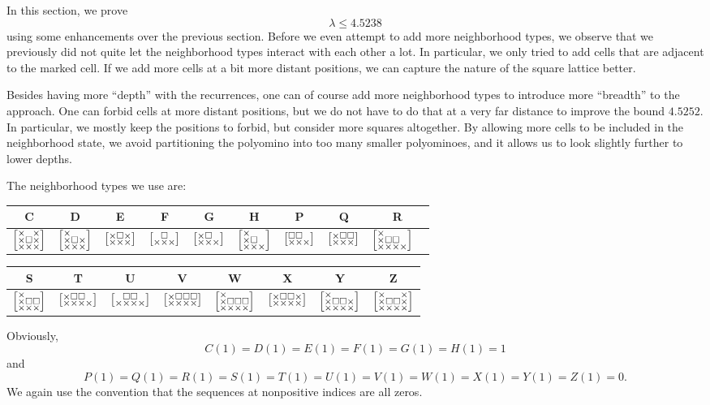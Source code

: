 \documentclass[a4paper,12pt]{article}
\makeatletter
\newenvironment{grid}
  {\begingroup\footnotesize
   \renewcommand{\arraystretch}{0}
   \setlength{\arraycolsep}{0pt}
   \left[\begin{array}{@{}*{10}{c}@{}}}
  {\end{array}\right]\endgroup}
\newcommand{\void}{\phantom{\times}}
\newcommand{\myC}{
    \begin{grid}
        \times & \void & \times \\
        \times & \square & \times \\
        \times & \times & \times
    \end{grid}
}
\newcommand{\myD}{
    \begin{grid}
        \times & \void & \void \\
        \times & \square & \times \\
	\times & \times & \times
    \end{grid}
}
\newcommand{\myE}{
    \begin{grid}
        \times & \square & \times \\
        \times & \times & \times
    \end{grid}
}
\newcommand{\myF}{
    \begin{grid}
        \void & \square & \void \\
        \times & \times & \times
    \end{grid}
}
\newcommand{\myG}{
    \begin{grid}
        \times & \square & \void \\
        \times & \times & \times
    \end{grid}
}
\newcommand{\myH}{
    \begin{grid}
        \times & \void & \void \\
        \times & \square & \void \\
        \times & \times & \times
    \end{grid}
}
\newcommand{\myP}{
    \begin{grid}
        \square & \square & \void \\
        \times & \times & \times
    \end{grid}
}
\newcommand{\myQ}{
    \begin{grid}
        \times & \square & \square \\
        \times & \times & \times
    \end{grid}
}
\newcommand{\myR}{
    \begin{grid}
        \times & \void & \void & \void \\
        \times & \square & \square & \void \\
        \times & \times & \times & \times
    \end{grid}
}
\newcommand{\myS}{
    \begin{grid}
        \times & \void & \void \\
        \times & \square & \square \\
        \times & \times & \times
    \end{grid}
}
\newcommand{\myT}{
    \begin{grid}
        \times & \square & \square & \void \\
        \times & \times & \times & \times
    \end{grid}
}
\newcommand{\myU}{
    \begin{grid}
        \void & \square & \square & \void \\
        \times & \times & \times & \times
    \end{grid}
}
\newcommand{\myV}{
    \begin{grid}
        \times & \square & \square & \square \\
        \times & \times & \times & \times
    \end{grid}
}
\newcommand{\myW}{
    \begin{grid}
        \times & \void & \void & \void \\
        \times & \square & \square & \square \\
        \times & \times & \times & \times
    \end{grid}
}
\newcommand{\myX}{
    \begin{grid}
        \times & \square & \square & \times \\
        \times & \times & \times & \times
    \end{grid}
}
\newcommand{\myY}{
    \begin{grid}
        \times & \void & \void & \void \\
        \times & \square & \square & \times \\
        \times & \times & \times & \times
    \end{grid}
}
\newcommand{\myZ}{
    \begin{grid}
        \times & \void & \void & \times \\
        \times & \square & \square & \times \\
        \times & \times & \times & \times
    \end{grid}
}
\makeatother
\begin{document}
In this section, we prove
\[
    \lambda\le 4.5238
\]
using some enhancements over the previous section.
Before we even attempt to add more neighborhood types, we observe that we previously did not quite let the neighborhood types interact with each other a lot. In particular, we only tried to add cells that are adjacent to the marked cell. If we add more cells at a bit more distant positions, we can capture the nature of the square lattice better. 

Besides having more ``depth'' with the recurrences, one can of course add more neighborhood types to introduce more ``breadth'' to the approach.
One can forbid cells at more distant positions, but we do not have to do that at a very far distance to improve the bound $4.5252$. In particular, we mostly keep the positions to forbid, but consider more squares altogether. By allowing more cells to be included in the neighborhood state, we avoid partitioning the polyomino into too many smaller polyominoes, and it allows us to look slightly further to lower depths.

The neighborhood types we use are:
\begin{center}
\begin{tabular}{ |c|c|c|c|c|c|c|c|c| } 
 \hline
	C & D & E & F & G & H & P & Q & R \\ 
 \hline
	$\myC$ & $\myD$ & $\myE$ & $\myF$ & $\myG$ & $\myH$ & $\myP$ & $\myQ$ & $\myR$ \ \\ 
 \hline
\end{tabular}
\end{center}

\begin{center}
\begin{tabular}{ |c|c|c|c|c|c|c|c| } 
 \hline
	S & T & U & V & W & X & Y & Z \\
 \hline
	$\myS$ & $\myT$ & $\myU$ & $\myV$ & $\myW$ & $\myX$ & $\myY$ & $\myZ$ \\ 
 \hline
\end{tabular}
\end{center}

Obviously,
\[
	C(1)=D(1)=E(1)=F(1)=G(1)=H(1)=1
\]
and
\[
	P(1)=Q(1)=R(1)=S(1)=T(1)=U(1)=V(1)=W(1)=X(1)=Y(1)=Z(1)=0.
\]
We again use the convention that the sequences at nonpositive indices are all zeros.
\end{document}
